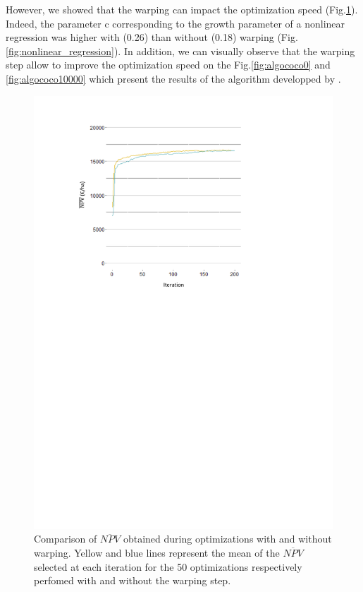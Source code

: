However, we showed that the warping can impact the optimization speed (Fig.\ref{fig:moyennesNPV}). Indeed, the parameter c corresponding to the growth parameter of a nonlinear regression was higher with (0.26) than without (0.18) warping (Fig.\ref{fig:nonlinear_regression}). In addition, we can visually observe that the warping step allow to improve the optimization speed on the Fig.\ref{fig:algococo0} and \ref{fig:algococo10000} which present the results of the algorithm developped by .

\begin{figure}[!ht]
	\centering
	\includegraphics[trim = 2cm 15cm 5cm 1cm, clip]{Figures_Warping_resultats_courbes_moyennes_mean_NPV_warping_sanswarping.pdf}
	\caption{Comparison of $\overline{NPV}$ obtained during optimizations with and without warping. Yellow and blue lines represent the mean of the $\overline{NPV}$ selected at each iteration for the 50 optimizations respectively perfomed with and without the warping step. }\label{fig:moyennesNPV}
\end{figure}

